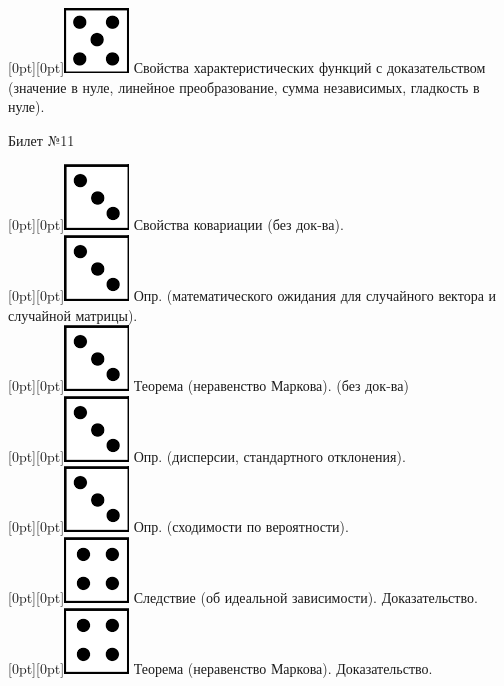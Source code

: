 \documentclass[10pt]{article}
\begin{document}
\raisebox{-1pt}[0pt][0pt]{\includegraphics[width=0.02\linewidth]{5.png}} Свойства характеристических функций с доказательством (значение в нуле, линейное преобразование, сумма независимых, гладкость в нуле). \\

\begin{center} {\Large Билет №11} \end{center} 

\raisebox{-1pt}[0pt][0pt]{\includegraphics[width=0.02\linewidth]{3.png}} Свойства ковариации (без док-ва). \\

\raisebox{-1pt}[0pt][0pt]{\includegraphics[width=0.02\linewidth]{3.png}} Опр. (математического ожидания для случайного вектора и случайной матрицы). \\

\raisebox{-1pt}[0pt][0pt]{\includegraphics[width=0.02\linewidth]{3.png}} Теорема (неравенство Маркова). (без док-ва) \\

\raisebox{-1pt}[0pt][0pt]{\includegraphics[width=0.02\linewidth]{3.png}} Опр. (дисперсии, стандартного отклонения). \\ 

\raisebox{-1pt}[0pt][0pt]{\includegraphics[width=0.02\linewidth]{3.png}} Опр. (сходимости по вероятности). \\

\raisebox{-1pt}[0pt][0pt]{\includegraphics[width=0.02\linewidth]{4.png}} Следствие (об идеальной зависимости). Доказательство. \\

\raisebox{-1pt}[0pt][0pt]{\includegraphics[width=0.02\linewidth]{4.png}} Теорема (неравенство Маркова). Доказательство. \\
\end{document}
